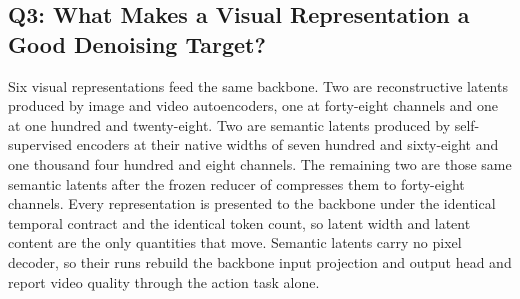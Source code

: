 \begin{table}[t]
\centering
\small
\caption{Q2, video backbone. Success rate under the protocol of
 together with the cost of each backbone at a fixed step
budget. Rows marked \tgt{} carry pre-registered target values and the unmarked
row is measured. Total parameters include the frozen autoencoder and text
encoder that each backbone ships.}
\label{tab:q2}
\end{table}

\subsection{Q3: What Makes a Visual Representation a Good Denoising Target?}
\label{sec:q3}

Six visual representations feed the same backbone. Two are reconstructive latents
produced by image and video autoencoders, one at forty-eight channels and one at
one hundred and twenty-eight. Two are semantic latents produced by
self-supervised encoders at their native widths of seven hundred and sixty-eight
and one thousand four hundred and eight channels. The remaining two are those
same semantic latents after the frozen reducer of  compresses them
to forty-eight channels. Every representation is presented to the backbone under
the identical temporal contract and the identical token count, so latent width
and latent content are the only quantities that move. Semantic latents carry no
pixel decoder, so their runs rebuild the backbone input projection and output
head and report video quality through the action task alone.

